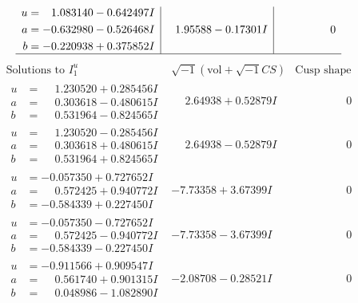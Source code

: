 \documentclass[1p]{elsarticle_modified}
\theoremstyle{definition}
\newcommand{\I}{\sqrt{-1}}
\begin{document}
$$\begin{array}{c|c|c}
\begin{aligned}
u &= \phantom{-}1.083140 - 0.642497 I \\
a &= -0.632980 - 0.526468 I \\
b &= -0.220938 + 0.375852 I\end{aligned}
 & \phantom{-}1.95588 - 0.17301 I & \phantom{-0.000000 } 0\\
 \hline 
 \end{array}$$\newpage$$\begin{array}{c|c|c}  
\text{Solutions to }I^u_{1}& \I (\text{vol} + \sqrt{-1}CS) & \text{Cusp shape}\\
 \hline 
\begin{aligned}
u &= \phantom{-}1.230520 + 0.285456 I \\
a &= \phantom{-}0.303618 - 0.480615 I \\
b &= \phantom{-}0.531964 - 0.824565 I\end{aligned}
 & \phantom{-}2.64938 + 0.52879 I & \phantom{-0.000000 } 0 \\ \hline\begin{aligned}
u &= \phantom{-}1.230520 - 0.285456 I \\
a &= \phantom{-}0.303618 + 0.480615 I \\
b &= \phantom{-}0.531964 + 0.824565 I\end{aligned}
 & \phantom{-}2.64938 - 0.52879 I & \phantom{-0.000000 } 0 \\ \hline\begin{aligned}
u &= -0.057350 + 0.727652 I \\
a &= \phantom{-}0.572425 + 0.940772 I \\
b &= -0.584339 + 0.227450 I\end{aligned}
 & -7.73358 + 3.67399 I & \phantom{-0.000000 } 0 \\ \hline\begin{aligned}
u &= -0.057350 - 0.727652 I \\
a &= \phantom{-}0.572425 - 0.940772 I \\
b &= -0.584339 - 0.227450 I\end{aligned}
 & -7.73358 - 3.67399 I & \phantom{-0.000000 } 0 \\ \hline\begin{aligned}
u &= -0.911566 + 0.909547 I \\
a &= \phantom{-}0.561740 + 0.901315 I \\
b &= \phantom{-}0.048986 - 1.082890 I\end{aligned}
 & -2.08708 - 0.28521 I & \phantom{-0.000000 } 0 \\ \hline\begin{aligned}

\end{aligned}
\end{array}$$
\end{document}
